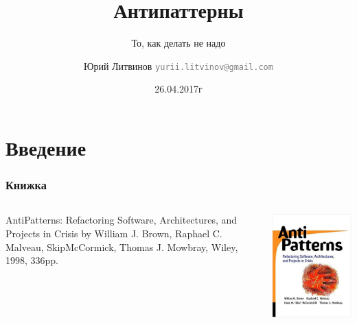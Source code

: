 \documentclass[xetex,mathserif,serif]{beamer}
\title{Антипаттерны}
\subtitle{То, как делать не надо}
\author[Юрий Литвинов]{Юрий Литвинов \newline \textcolor{gray}{\small\texttt{yurii.litvinov@gmail.com}}}
\date{26.04.2017г}
\begin{document}
	
	\frame{\titlepage}

	\section{Введение}

	\begin{frame}
		\frametitle{Книжка}
		\begin{columns}
			\begin{column}{0.6\textwidth}
				AntiPatterns: Refactoring Software, Architectures, and Projects in Crisis by William J. Brown, Raphael C. Malveau, SkipMcCormick, Thomas J. Mowbray, Wiley, 1998, 336pp.
			\end{column}
			\begin{column}{0.4\textwidth}
				\begin{center}
					\includegraphics[width=\textwidth]{bookCover.png}
				\end{center}
			\end{column}
		\end{columns}
	\end{frame}
\end{document}
